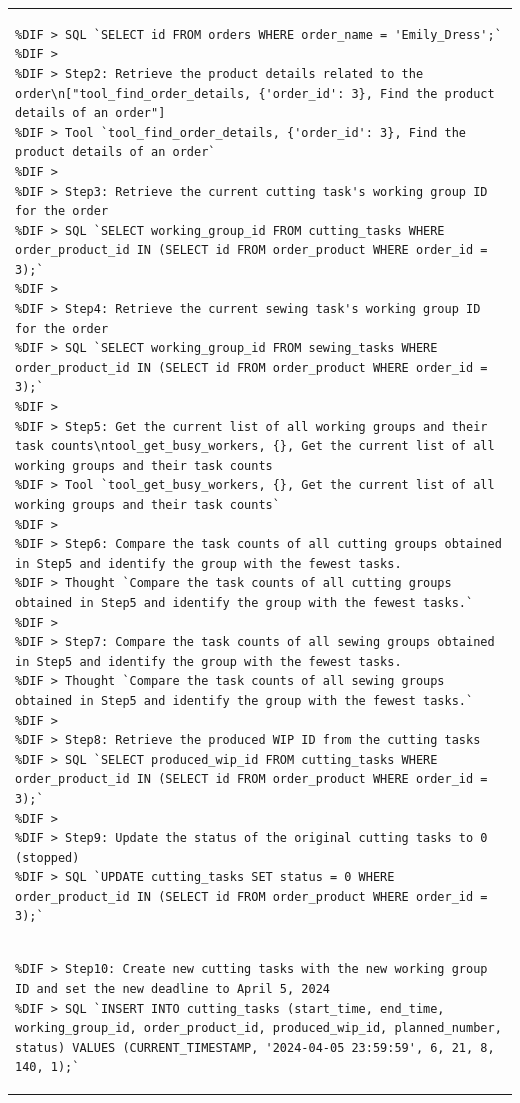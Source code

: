 \documentclass[preprint,12pt]{elsarticle}
\providecommand{\DIFmodbegin}{} %
\providecommand{\DIFmodend}{} %
\begin{document}
\begin{center}
\begin{longtable}{p{390pt}}
\DIFmodbegin
\begin{lstlisting}[style=my_operation, label={lst:chain_of_operation},alsolanguage=DIFcode]
%DIF > Step 1: Retrieve the order ID for the order with the name "Emily_Dress"
%DIF > SQL `SELECT id FROM orders WHERE order_name = 'Emily_Dress';`
%DIF > 
%DIF > Step2: Retrieve the product details related to the order\n["tool_find_order_details, {'order_id': 3}, Find the product details of an order"]
%DIF > Tool `tool_find_order_details, {'order_id': 3}, Find the product details of an order`
%DIF > 
%DIF > Step3: Retrieve the current cutting task's working group ID for the order
%DIF > SQL `SELECT working_group_id FROM cutting_tasks WHERE order_product_id IN (SELECT id FROM order_product WHERE order_id = 3);`
%DIF > 
%DIF > Step4: Retrieve the current sewing task's working group ID for the order
%DIF > SQL `SELECT working_group_id FROM sewing_tasks WHERE order_product_id IN (SELECT id FROM order_product WHERE order_id = 3);`
%DIF > 
%DIF > Step5: Get the current list of all working groups and their task counts\ntool_get_busy_workers, {}, Get the current list of all working groups and their task counts
%DIF > Tool `tool_get_busy_workers, {}, Get the current list of all working groups and their task counts`
%DIF > 
%DIF > Step6: Compare the task counts of all cutting groups obtained in Step5 and identify the group with the fewest tasks.
%DIF > Thought `Compare the task counts of all cutting groups obtained in Step5 and identify the group with the fewest tasks.`
%DIF > 
%DIF > Step7: Compare the task counts of all sewing groups obtained in Step5 and identify the group with the fewest tasks.
%DIF > Thought `Compare the task counts of all sewing groups obtained in Step5 and identify the group with the fewest tasks.`
%DIF > 
%DIF > Step8: Retrieve the produced WIP ID from the cutting tasks
%DIF > SQL `SELECT produced_wip_id FROM cutting_tasks WHERE order_product_id IN (SELECT id FROM order_product WHERE order_id = 3);`
%DIF > 
%DIF > Step9: Update the status of the original cutting tasks to 0 (stopped)
%DIF > SQL `UPDATE cutting_tasks SET status = 0 WHERE order_product_id IN (SELECT id FROM order_product WHERE order_id = 3);`
\end{lstlisting}
\DIFmodend\\
\DIFmodbegin
\begin{lstlisting}[style=my_operation, label={lst:chain_of_operation},alsolanguage=DIFcode]
%DIF > 
%DIF > Step10: Create new cutting tasks with the new working group ID and set the new deadline to April 5, 2024
%DIF > SQL `INSERT INTO cutting_tasks (start_time, end_time, working_group_id, order_product_id, produced_wip_id, planned_number, status) VALUES (CURRENT_TIMESTAMP, '2024-04-05 23:59:59', 6, 21, 8, 140, 1);`

\end{lstlisting}
\end{longtable}
\end{center}
\end{document}
